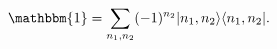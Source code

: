\begin{equation}\label{eq:unew}
    \mathbbm{1}=\sum_{n_1,n_2}(-1)^{n_2}
    |n_1,n_2\rangle\langle n_1,n_2|.
\end{equation}

